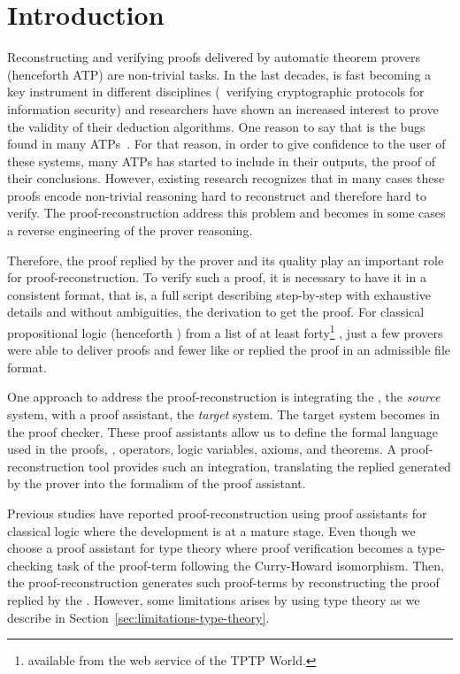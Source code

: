 \documentclass[../main.tex]{subfiles}
\begin{document}

\section{Introduction}
\label{sec:introduction}

Reconstructing and verifying proofs delivered by automatic theorem provers
(henceforth ATP) are non-trivial tasks.
In the last decades, \ATPs is fast becoming a key instrument in 
different disciplines (\eg~verifying cryptographic protocols for information security) and researchers have shown an increased interest to prove the validity of their deduction algorithms.
One reason to say that is the bugs found in many ATPs~\cite{Keller2013,Bohme2011,Fleury2014}.
For that reason, in order to give confidence to the user of these systems,
many ATPs has started to include in their outputs, the proof of their
conclusions. However, existing research recognizes that in many cases these proofs encode non-trivial reasoning
hard to reconstruct and therefore hard to verify. The proof-reconstruction
address this problem and becomes in some cases a reverse engineering of the
prover reasoning.

Therefore, the proof replied by the prover and its quality play an important role for proof-reconstruction. To verify such a proof, it is necessary to have
it in a consistent format, that is, a full script 
describing step-by-step with exhaustive details and without ambiguities, the derivation to get the proof.
For classical propositional logic (henceforth \CPL) from a list of at least forty\footnote{\ATPs 
available from the web
service  of the TPTP World.} \ATPs, just a few
provers were able to deliver proofs and fewer like  or \Metis 
replied the proof in an admissible file format.

One approach to address the proof-reconstruction 
is integrating the \ATP, the \emph{source} system, with a proof assistant, the 
\emph{target} system.
The target system becomes in the proof checker. These proof assistants allow 
us to define the formal language used in the proofs, \ie, operators, logic 
variables, axioms, and theorems. A proof-reconstruction tool provides such an
integration, translating the replied generated by the prover into the formalism of the proof assistant.

Previous studies have reported proof-reconstruction using proof assistants for classical logic where the development is at a mature stage.
Even though we choose a proof assistant for type theory
where proof verification becomes a type-checking task of the proof-term following the Curry-Howard isomorphism. Then, the proof-reconstruction generates such proof-terms by reconstructing the proof replied by the \ATP.
However, some limitations arises by using type theory as we describe in Section~\ref{sec:limitations-type-theory}.
\end{document}
